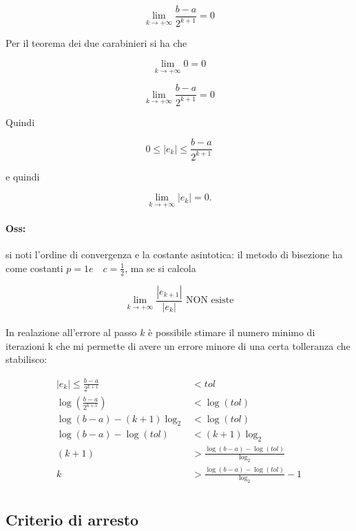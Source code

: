 \documentclass[a4paper, 11pt]{article}
\begin{document}
        \[
            \lim_{k \to +\infty} \frac{b-a}{2^{k+1}} = 0
        \]

        Per il teorema dei due carabinieri si ha che 

        \[
            \lim_{k \to +\infty} 0 = 0
        \]

        \[
            \lim_{k \to +\infty} \frac{b-a}{2^{k+1}} = 0
        \]

        Quindi 

        \[
            0 \leq |e_k| \leq \frac{b-a}{2^{k+1}}
        \]

        e quindi 

        \[
            \lim_{k \to +\infty} |e_k| = 0.
        \]

        \paragraph{Oss: } si noti l'ordine di convergenza e la costante asintotica: il metodo di bisezione ha come costanti $p = 1 e \quad c = \frac{1}{2}$, ma se si calcola 

        \[
            \lim_{k \to +\infty} \frac{|e_{k+1}|}{|e_k|} \text{ NON esiste}
        \]

        \paragraph{}
        In realazione all'errore al passo $k$ è possibile stimare il numero minimo di iterazioni k che mi permette di avere un errore  minore di una certa tolleranza che stabilisco:
        
        \begin{align*}
            |e_k| \le \frac{b-a}{2^{k+1}} &< tol \\
            \log \left (\frac{b-a}{2^{k+1}} \right ) &< \log(tol) \\
            \log(b-a) - (k+1)\log_2 &< \log(tol) \\
            \log(b-a) - \log(tol) &< (k+1)\log_2 \\
            (k+1) &> \frac{\log(b-a)-\log(tol)}{\log_2} \\
            k &>  \frac{\log(b-a)-\log(tol)}{\log_2} -1 \\
        \end{align*}


        \subsection{Criterio di arresto}
\end{document}
